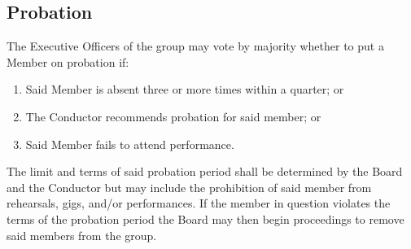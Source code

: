\documentclass{article}
\begin{document}
\subsection{Probation}

The Executive Officers of the group may vote by majority whether to
put a Member on probation if:
\begin{enumerate}
\item Said Member is absent three or more times within a quarter; or
\item The Conductor recommends probation for said member; or
\item Said Member fails to attend performance.
\end{enumerate}
The limit and terms of said probation period shall be determined by
the Board and the Conductor but may include the prohibition
of said member from rehearsals, gigs, and/or performances. If the
member in question violates the terms of the probation period the
Board may then begin proceedings to remove said members from the group.

\end{document}
